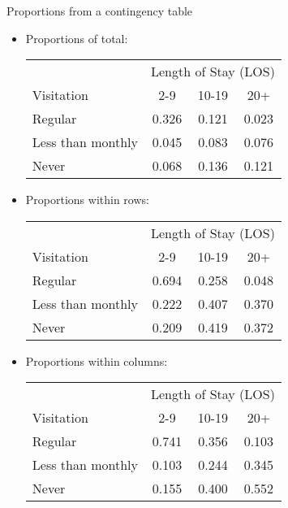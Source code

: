 \documentclass[xcolor=dvipsnames]{beamer}
\begin{document}
\begin{frame}{Proportions from a contingency table}
	\begin{itemize}
		\item Proportions of total:
		{\scriptsize
		\begin{center}
			\begin{tabular}{|l|ccc|}
				  \hline
				  & \multicolumn{3}{c|}{Length of Stay (LOS)}\\
  				Visitation & 2-9 & 10-19 & 20+ \\ \hline
				Regular          & 0.326& 0.121& 0.023 \\
				Less than monthly& 0.045& 0.083& 0.076 \\
				Never            & 0.068& 0.136& 0.121 \\ \hline
			\end{tabular}
		\end{center}}
	 \vspace{1mm}
		\item Proportions within rows:
			{\scriptsize
			\begin{center}
				\begin{tabular}{|l|ccc|}
					\hline
					& \multicolumn{3}{c|}{Length of Stay (LOS)}\\
					Visitation & 2-9 & 10-19 & 20+ \\ \hline
				Regular           & 0.694 & 0.258 & 0.048 \\
				Less than monthly & 0.222 & 0.407 & 0.370 \\
				Never             & 0.209 & 0.419 & 0.372 \\ \hline
				\end{tabular}
		\end{center}}
	\vspace{1mm}
		\item Proportions within columns:
		{\scriptsize
			\begin{center}
				\begin{tabular}{|l|ccc|}
					\hline
					& \multicolumn{3}{c|}{Length of Stay (LOS)}\\
					Visitation & 2-9 & 10-19 & 20+ \\ \hline
				Regular            &0.741  &0.356  &0.103 \\
				Less than monthly  &0.103  &0.244  &0.345 \\
				Never              &0.155  &0.400  &0.552 \\ \hline
				\end{tabular}
		\end{center}}
	\end{itemize}
\end{frame}
\end{document}
